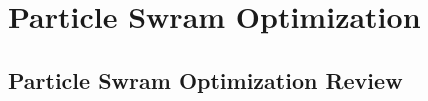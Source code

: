 %
%
%
%

%
%

\chapter{Particle Swram Optimization}
\label{sec:ParticleSwramOptimization}

 
\section{Particle Swram Optimization Review}
\label{sec:ParticleSwramOptimizationReview}



